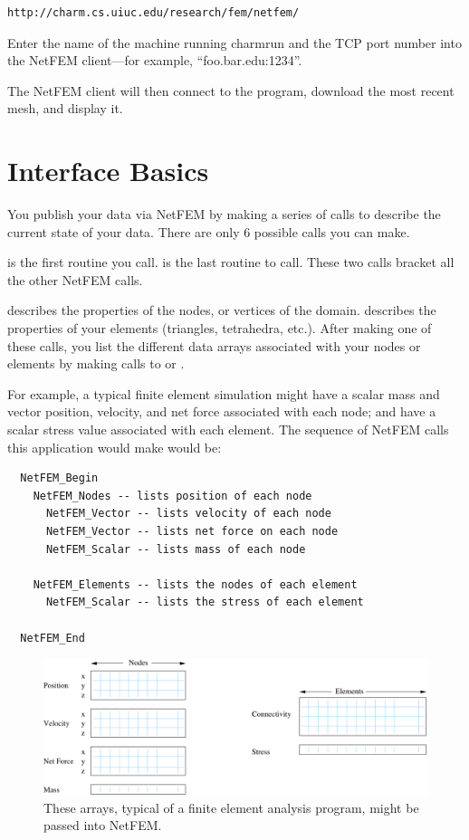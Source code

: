 \documentclass[10pt]{article}
\begin{document}
\begin{verbatim}
http://charm.cs.uiuc.edu/research/fem/netfem/
\end{verbatim}

Enter the name of the machine running charmrun and
the TCP port number into the NetFEM client---for example, 
``foo.bar.edu:1234''.

The NetFEM client will then connect to the program,
download the most recent mesh, and display it.



\section{Interface Basics}

You publish your data via NetFEM by making a series of
calls to describe the current state of your data.  
There are only 6 possible calls you can make.

 is the first routine you call.
 is the last routine to call.  These
two calls bracket all the other NetFEM calls.

 describes the properties of the
nodes, or vertices of the domain.  
describes the properties of your elements (triangles,
tetrahedra, etc.).  After making one of these calls,
you list the different data arrays associated with your 
nodes or elements by making calls to  
or .

For example, a typical finite element simulation might
have a scalar mass and vector position, velocity, and net force
associated with each node; and have a scalar stress value
associated with each element.  The sequence of NetFEM calls
this application would make would be:

\begin{verbatim}
  NetFEM_Begin
    NetFEM_Nodes -- lists position of each node
      NetFEM_Vector -- lists velocity of each node
      NetFEM_Vector -- lists net force on each node
      NetFEM_Scalar -- lists mass of each node
    
    NetFEM_Elements -- lists the nodes of each element
      NetFEM_Scalar -- lists the stress of each element
  
  NetFEM_End
\end{verbatim}

\begin{figure}[h]
\begin{center}
\includegraphics[width=5in]{fig/example}
\end{center}
\caption{These arrays, typical of a finite element analysis
program, might be passed into NetFEM.}
\label{fig:example}
\end{figure}
\end{document}
